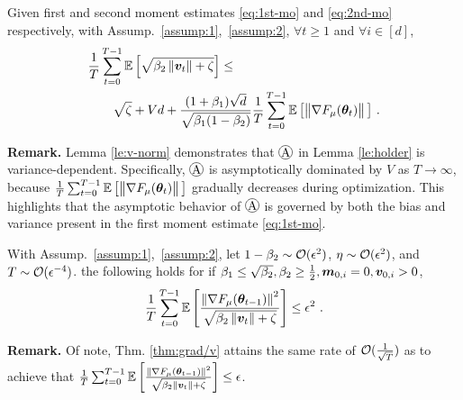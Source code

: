 \begin{lemma}\label{le:v-norm}
Given first and second moment estimates \eqref{eq:1st-mo} and \eqref{eq:2nd-mo} respectively, with Assump.~\ref{assump:1},~\ref{assump:2}, $\forall{t} \geq 1$ and $\forall{i} \in [d]$,
\begin{equation}
\begin{aligned}
&\frac{1}{T}\sum_{t=0}^{T-1} \E\left[\sqrt{\beta_2\left\|\vv_{t}\right\|+\zeta}\right] \leq \\
&\qquad \sqrt{\zeta} + Vd + \frac{(1+\beta_1)\sqrt{d}}{\sqrt{\beta_1(1-\beta_2)}} \frac{1}{T} \sum_{t=0}^{T-1} \E\left[\big\|\nabla F_{\mu}(\vtheta_t)\right\|\big] \ .
\end{aligned}
\end{equation}
\end{lemma}
\textbf{Remark.} Lemma \ref{le:v-norm} demonstrates that $\circled{A}$ in Lemma \ref{le:holder} is variance-dependent. Specifically, $\circled{A}$ is asymptotically dominated by $V$ as $T \to \infty$, because $\frac{1}{T} \sum_{t=0}^{T-1} \mathbb{E}\left[\big\|\nabla F_{\mu}({\bm{\theta}}_t)\right\|\big]$ gradually decreases during optimization. This highlights that the asymptotic behavior of $\circled{A}$ is governed by both the bias and variance present in the first moment estimate \eqref{eq:1st-mo}.

\begin{theorem}[Informal]\label{thm:grad/v}
With Assump.~\ref{assump:1},~\ref{assump:2}, let $1-\beta_2 \sim {\mathcal{O}}({\epsilon}^2)$, $\eta \sim {\mathcal{O}}({\epsilon}^2)$, and $T \sim {\mathcal{O}}({\epsilon}^{-4})$. the following holds for \ours{} if $\beta_1 \leq \sqrt{\beta_2}, \beta_2 \geq \frac{1}{2}, {\bm{m}}_{0,i}=0,{\bm{v}}_{0,i}>0$,
\begin{equation}
\frac{1}{T}\sum_{t=0}^{T-1}\mathbb{E}\left[\frac{\left\|\nabla
F_{\mu}({\bm{\theta}}_{t-1})\right\|^2}{\sqrt{\beta_2\left\|{\bm{v}}_{t}\right\|+\zeta}}\right] \leq {\epsilon}^2 \ .
\end{equation}
\end{theorem}
\textbf{Remark.} Of note, Thm. \ref{thm:grad/v} attains the same rate of ${\mathcal{O}}(\frac{1}{\sqrt{T}})$ as \citep{zo-adamm, nazari2020adaptive} to achieve that $\frac{1}{T}\sum_{t=0}^{T-1}\mathbb{E}\left[\frac{\left\|\nabla
F_{\mu}({\bm{\theta}}_{t-1})\right\|^2}{\sqrt{\beta_2\left\|{\bm{v}}_{t}\right\|+\zeta}}\right] \leq {\epsilon}$.

